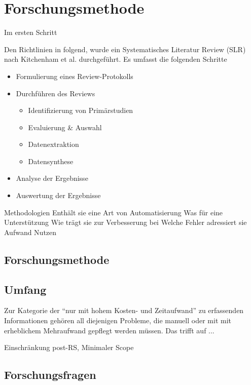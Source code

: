 \section{Forschungsmethode}

Im ersten Schritt 

Den Richtlinien in \cite{Keele2007GuidelinesEngineering} folgend, wurde ein Systematisches Literatur Review (SLR) nach Kitchenham et al. durchgeführt. Es umfasst die folgenden Schritte

\begin{itemize}
    \item Formulierung eines Review-Protokolls
    \item Durchführen des Reviews
        \begin{itemize}
            \item Identifizierung von Primärstudien
            \item Evaluierung \& Auswahl
            \item Datenextraktion
            \item Datensynthese
        \end{itemize}
    \item Analyse der Ergebnisse
    \item Auswertung der Ergebnisse
\end{itemize}


Methodologien
Enthält sie eine Art von Automatisierung
Was für eine Unterstützung
Wie trägt sie zur Verbesserung bei
Welche Fehler adressiert sie
Aufwand
Nutzen


\subsection{Forschungsmethode}



\subsection{Umfang}
Zur Kategorie der \enquote{nur mit hohem Kosten- und Zeitaufwand} zu erfassenden Informationen gehören all diejenigen Probleme, die manuell oder mit mit erheblichem Mehraufwand gepflegt werden müssen. Das trifft auf ...


Einschränkung post-RS, Minimaler Scope

\subsection{Forschungsfragen}

